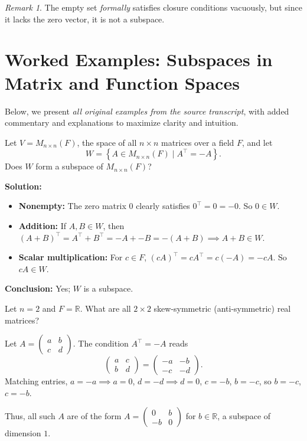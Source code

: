 \documentclass[11pt,a4paper]{article}
\theoremstyle{definition}
\theoremstyle{plain}
\theoremstyle{remark}
\newtheorem{remark}[definition]{Remark}
\begin{document}
\begin{remark}
The empty set \emph{formally} satisfies closure conditions vacuously, but since it lacks the zero vector, it is not a subspace.
\end{remark}

\section{Worked Examples: Subspaces in Matrix and Function Spaces}

Below, we present \emph{all original examples from the source transcript}, with added commentary and explanations to maximize clarity and intuition.

\begin{original_example}[title=Subspace of Anti-Symmetric Matrices]
Let $V = M_{n\times n}(F)$, the space of all $n\times n$ matrices over a field $F$, and let 
\[
    W = \left\{A \in M_{n\times n}(F) \mid A^\top = -A \right\}.
\]
Does $W$ form a subspace of $M_{n\times n}(F)$?

\textbf{Solution:}
\begin{itemize}
    \item \textbf{Nonempty:} The zero matrix $0$ clearly satisfies $0^\top = 0 = -0$. So $0 \in W$.
    \item \textbf{Addition:} If $A, B \in W$, then $(A+B)^\top = A^\top + B^\top = -A + -B = -(A+B) \implies A+B \in W$.
    \item \textbf{Scalar multiplication:} For $c \in F$, $(cA)^\top = cA^\top = c(-A) = -cA$. So $cA \in W$.
\end{itemize}
\textbf{Conclusion:} Yes; $W$ is a subspace.
\end{original_example}

\begin{additional_example}
Let $n=2$ and $F = \mathbb{R}$.
What are all $2 \times 2$ skew-symmetric (anti-symmetric) real matrices?

Let $A = \begin{pmatrix} a & b \\ c & d \end{pmatrix}$. The condition $A^\top = -A$ reads
\[
    \begin{pmatrix} a & c \\ b & d \end{pmatrix} = \begin{pmatrix} -a & -b \\ -c & -d \end{pmatrix}.
\]
Matching entries, $a = -a \implies a=0$, $d=-d \implies d=0$, $c = -b$, $b = -c$, so $b = -c$, $c = -b$.

Thus, all such $A$ are of the form $A = \begin{pmatrix} 0 & b \\ -b & 0 \end{pmatrix}$ for $b \in \mathbb{R}$, a subspace of dimension $1$.
\end{additional_example}
\end{document}
